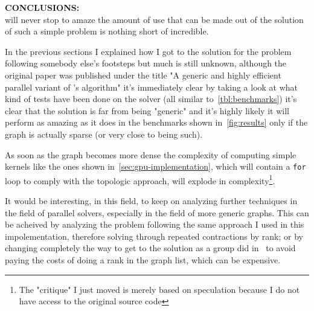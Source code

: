 \documentclass[a4paper,10pt]{article}
\begin{document}
\bigskip
{}
\makeatletter{}\makeatother\label{sec:final-thoughts}
\noindent
\textbf{CONCLUSIONS:}
\\
\mstp will never stop to amaze the amount of use that can be made out of the solution of such a simple problem is nothing short of incredible.

In the previous sections I explained how I got to the solution for the problem following somebody else's footsteps but much is still unknown, although the original paper was published under the title "A generic and highly efficient parallel variant of \brka's algorithm" it's immediately clear by taking a look at what kind of tests have been done on the solver (all similar to~\ref{tbl:benchmarks}) it's clear that the solution is far from being "generic" and it's highly likely it will perform as amazing as it does in the benchmarks shown in~\ref{fig:results} only if the graph is actually sparse (or very close to being such).

As soon as the graph becomes more dense the complexity of computing simple kernels like the ones shown in~\ref{sec:gpu-implementation}, which will contain a \texttt{for} loop to comply with the topologic approach, will explode in complexity\footnote{The "critique" I just moved is merely based on speculation because I do not have access to the original source code}.

It would be interesting, in this field, to keep on analyzing further techniques in the field of parallel \mstp solvers, especially in the field of more generic graphs. This can be acheived by analyzing the problem following the same approach I used in this impolementation, therefore solving \mstp through repeated contractions by rank; or by changing completely the way to get to the solution as a group did in~\cite{mst-bipartite} to avoid paying the costs of doing a rank in the graph list, which can be expensive.

\clearpage

\printbibliography
\end{document}
